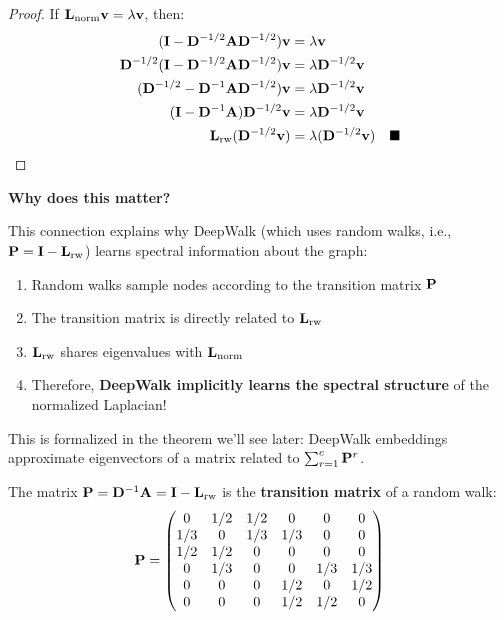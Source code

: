 \begin{notechapter}
\begin{proof}
If $\mathbf{L}_{\text{norm}} \mathbf{v} = \lambda \mathbf{v}$, then:
\begin{align*}
(\mathbf{I} - \mathbf{D}^{-1/2}\mathbf{A}\mathbf{D}^{-1/2})\mathbf{v} &= \lambda \mathbf{v} \\
\mathbf{D}^{-1/2}(\mathbf{I} - \mathbf{D}^{-1/2}\mathbf{A}\mathbf{D}^{-1/2})\mathbf{v} &= \lambda \mathbf{D}^{-1/2}\mathbf{v} \\
(\mathbf{D}^{-1/2} - \mathbf{D}^{-1}\mathbf{A}\mathbf{D}^{-1/2})\mathbf{v} &= \lambda \mathbf{D}^{-1/2}\mathbf{v} \\
(\mathbf{I} - \mathbf{D}^{-1}\mathbf{A})\mathbf{D}^{-1/2}\mathbf{v} &= \lambda \mathbf{D}^{-1/2}\mathbf{v} \\
\mathbf{L}_{\text{rw}} (\mathbf{D}^{-1/2}\mathbf{v}) &= \lambda (\mathbf{D}^{-1/2}\mathbf{v}) \quad \blacksquare
\end{align*}
\end{proof}

\begin{keyinsight}
\textbf{Why does this matter?}

This connection explains why DeepWalk (which uses random walks, i.e., $\mathbf{P} = \mathbf{I} - \mathbf{L}_{\text{rw}}$) learns spectral information about the graph:
\begin{enumerate}
    \item Random walks sample nodes according to the transition matrix $\mathbf{P}$
    \item The transition matrix is directly related to $\mathbf{L}_{\text{rw}}$
    \item $\mathbf{L}_{\text{rw}}$ shares eigenvalues with $\mathbf{L}_{\text{norm}}$
    \item Therefore, \textbf{DeepWalk implicitly learns the spectral structure} of the normalized Laplacian!
\end{enumerate}

This is formalized in the theorem we'll see later: DeepWalk embeddings approximate eigenvectors of a matrix related to $\sum_{r=1}^{c} \mathbf{P}^r$.
\end{keyinsight}

\begin{example}
The matrix $\mathbf{P} = \mathbf{D}^{-1}\mathbf{A} = \mathbf{I} - \mathbf{L}_{\text{rw}}$ is the \textbf{transition matrix} of a random walk:
\[
\mathbf{P} = \begin{pmatrix}
0 & 1/2 & 1/2 & 0 & 0 & 0 \\
1/3 & 0 & 1/3 & 1/3 & 0 & 0 \\
1/2 & 1/2 & 0 & 0 & 0 & 0 \\
0 & 1/3 & 0 & 0 & 1/3 & 1/3 \\
0 & 0 & 0 & 1/2 & 0 & 1/2 \\
0 & 0 & 0 & 1/2 & 1/2 & 0
\end{pmatrix}
\]


\end{example}
\end{notechapter}
